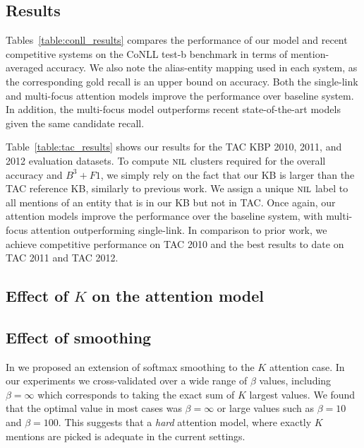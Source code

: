 \subsection{Results}

Tables~\ref{table:conll_results} compares the performance of our model
and recent competitive systems on the CoNLL test-b benchmark
 in terms of mention-averaged accuracy. We also note the alias-entity
 mapping used in each system, as the corresponding gold recall is
 an upper bound on accuracy. Both the single-link and multi-focus attention models
 improve the performance over baseline system. In addition, the multi-focus model
 outperforms recent state-of-the-art models given the same candidate recall.

Table~\ref{table:tac_results} shows our results for the TAC KBP 2010, 2011, and 2012
evaluation datasets. To compute $\mbox{\textsc{nil}}$ clusters required for the overall accuracy
and $B^3+F1$, we simply rely on the fact that our KB is larger than the TAC
reference KB, similarly to previous work. We assign a unique $\mbox{\textsc{nil}}$ label to
all mentions of an entity that is in our KB but not in TAC. 
Once again, our attention models improve the performance over the baseline
system, with multi-focus attention outperforming single-link. In comparison to
prior work, we achieve competitive performance on TAC 2010 and the best
results to date on TAC 2011 and TAC 2012.


\subsection{Effect of $K$ on the attention model}


\subsection{Effect of smoothing}
In  we proposed an extension of softmax smoothing to the $K$ attention case. In our experiments 
we cross-validated over a wide range of $\beta$ values, including $\beta=\infty$ which corresponds to taking
the exact sum of $K$ largest values. We found that the optimal value in most cases was  $\beta=\infty$ or large values
such as $\beta=10$ and $\beta=100$. This suggests that a {\em hard} attention model, where exactly $K$ mentions are picked is adequate in the current settings.



